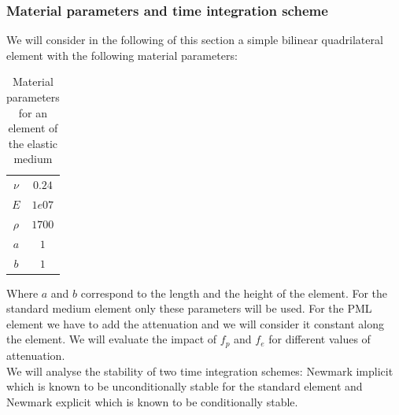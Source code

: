 \subsubsection{Material parameters and time integration scheme}
We will consider in the following of this section a simple bilinear quadrilateral element with the following material parameters:
\begin{table}[H]
\centering
\caption{Material parameters for an element of the elastic medium}
\begin{tabular}{c|c}
$\nu$ & $0.24$ \\
$E$ & $1e07$ \\
$\rho$ & $1700$ \\
$a$ & $1$ \\
$b$ & $1$
\end{tabular}
\end{table} 
Where $a$ and $b$ correspond to the length and the height of the element.
For the standard medium element only these parameters will be used. For the PML element we have to add the attenuation and we will consider it constant along the element. We will evaluate the impact of $f_p$ and $f_e$ for different values of attenuation.\\
We will analyse the stability of two time integration schemes: Newmark implicit which is known to be unconditionally stable for the standard element and Newmark explicit which is known to be conditionally stable. 
